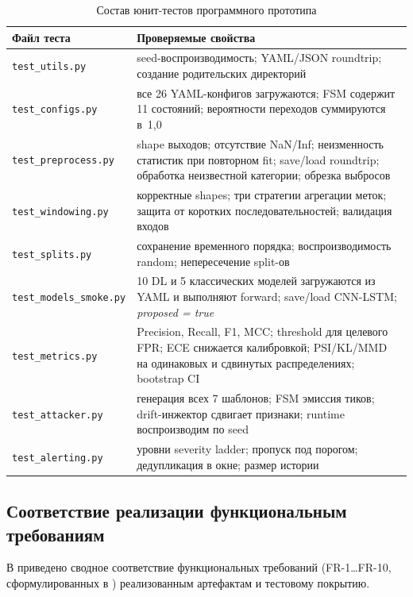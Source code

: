 \begin{table}[H]
\centering
\caption{Состав юнит-тестов программного прототипа}
\label{tab:tests}
\renewcommand{\arraystretch}{1.2}
\small
\begin{tabularx}{\linewidth}{@{}lX@{}}
\toprule
\textbf{Файл теста} & \textbf{Проверяемые свойства} \\
\midrule
\texttt{test\_utils.py}        & seed-воспроизводимость; YAML/JSON roundtrip; создание родительских директорий \\
\texttt{test\_configs.py}      & все 26 YAML-конфигов загружаются; FSM содержит 11 состояний; вероятности переходов суммируются в~1{,}0 \\
\texttt{test\_preprocess.py}   & shape выходов; отсутствие NaN/Inf; неизменность статистик при повторном fit; save/load roundtrip; обработка неизвестной категории; обрезка выбросов \\
\texttt{test\_windowing.py}    & корректные shapes; три стратегии агрегации меток; защита от коротких последовательностей; валидация входов \\
\texttt{test\_splits.py}       & сохранение временного порядка; воспроизводимость random; непересечение split-ов \\
\texttt{test\_models\_smoke.py}& 10 DL и 5 классических моделей загружаются из YAML и выполняют forward; save/load CNN-LSTM; \emph{proposed = true} \\
\texttt{test\_metrics.py}      & Precision, Recall, F1, MCC; threshold для целевого FPR; ECE снижается калибровкой; PSI/KL/MMD на одинаковых и сдвинутых распределениях; bootstrap CI \\
\texttt{test\_attacker.py}     & генерация всех 7 шаблонов; FSM эмиссия тиков; drift-инжектор сдвигает признаки; runtime воспроизводим по seed \\
\texttt{test\_alerting.py}     & уровни severity ladder; пропуск под порогом; дедупликация в окне; размер истории \\
\bottomrule
\end{tabularx}
\end{table}

\subsection{Соответствие реализации функциональным требованиям}

В  приведено сводное соответствие
функциональных требований (FR-1…FR-10, сформулированных в
) реализованным артефактам и тестовому покрытию.

